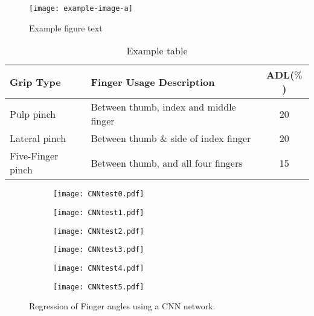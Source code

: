 \documentclass[../main.tex]{subfiles}
\begin{document}
\begin{figure}[h]
\begin{center}
\texttt{[image: example-image-a]}
\caption{Example figure text}
\label{fig:template}
\end{center}
\end{figure}

\begin{table}
\begin{center}
\begin{tabular}{ |l|l|c| } 
 \hline
 Grip Type & Finger Usage Description & ADL($\%$) \\ 
 \hline
 Pulp pinch & Between thumb, index and middle finger & 20 \\ 
 Lateral pinch & Between thumb \& side of index finger & 20 \\ 
 Five-Finger pinch & Between thumb, and all four fingers & 15 \\ 
 \hline
\end{tabular}
\caption{Example table}
\label{tab:??}
\end{center}
\end{table}

\begin{figure}
    \centering
    \begin{subfigure}[b]{0.49\textwidth}
        \centering
        \texttt{[image: CNNtest0.pdf]}
        \caption{}
        \label{fig:y equals x}
    \end{subfigure}
    \hfill
    \centering
    \begin{subfigure}[b]{0.49\textwidth}
        \centering
        \texttt{[image: CNNtest1.pdf]}
        \caption{}
        \label{fig:y equals x}
    \end{subfigure}
    \hfill
    \begin{subfigure}[b]{0.49\textwidth}
        \centering
        \texttt{[image: CNNtest2.pdf]}
        \caption{}
        \label{fig:three sin x}
    \end{subfigure}
    \hfill
    \begin{subfigure}[b]{0.49\textwidth}
        \centering
        \texttt{[image: CNNtest3.pdf]}
        \caption{}
        \label{fig:five over x}
    \end{subfigure}
    \hfill
    \begin{subfigure}[b]{0.49\textwidth}
        \centering
        \texttt{[image: CNNtest4.pdf]}
        \caption{}
        \label{fig:five over x}
    \end{subfigure}
    \hfill
    \begin{subfigure}[b]{0.49\textwidth}
        \centering
        \texttt{[image: CNNtest5.pdf]}
        \caption{}
        \label{fig:five over x}
    \end{subfigure}
    \hfill
    \caption{Regression of Finger angles using a CNN network.}
    \label{fig:CNNregression}
\end{figure}
\end{document}
